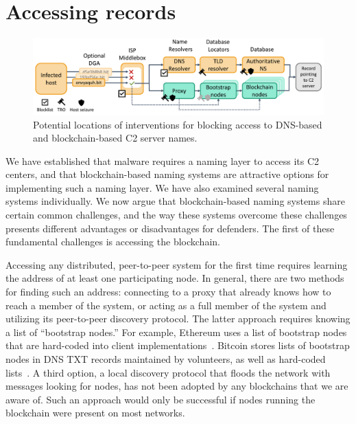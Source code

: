 \section{Accessing records}
\label{sec:accessing_records}

\begin{figure}[t]
	\centering
	\includegraphics[width=\textwidth]{figs/intervention_locations.pdf}
	\caption{Potential locations of interventions for 
	blocking access to DNS-based and blockchain-based C2 
	server names.}
	\label{fig:malware_contacting_cnc}
\end{figure}

We have established that malware requires a naming layer to access its C2 
centers, and 
that blockchain-based naming systems are attractive options for implementing 
such a naming layer. We have also examined several naming systems individually. 
We now argue that blockchain-based naming systems share certain common 
challenges, and the way these systems overcome these challenges presents 
different advantages or disadvantages for defenders. The first 
of these fundamental challenges is accessing the blockchain.

Accessing any distributed, peer-to-peer system for the first time requires 
learning the address of at least one participating node. In general, there 
are two methods for finding such an address: connecting to a 
proxy that already knows how to reach a member of the system, or acting 
as a full member of the system and utilizing its peer-to-peer discovery 
protocol. The latter approach requires knowing a list of ``bootstrap nodes.'' 
For example, Ethereum uses a list of bootstrap nodes that are hard-coded into 
client implementations~\cite{geth_bootstrap}. Bitcoin 
stores lists of bootstrap nodes in DNS TXT records maintained by volunteers, as 
well as hard-coded 
lists~\cite{bitcoin_bootstrap}. A third option, a 
local discovery protocol that floods the network with 
messages looking for nodes, has not been adopted by any 
blockchains that we are aware of. Such an approach would only be successful if 
nodes running the blockchain were present on most networks. 
 
